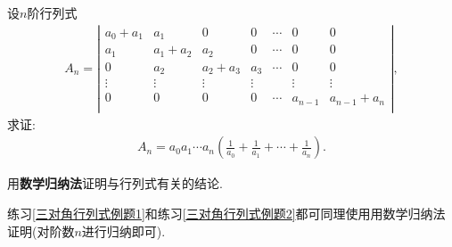 \documentclass[../../main.tex]{subfiles}%
\begin{document}
\begin{example}\label{使用数学归纳法计算行列式例题1}
    设$n$阶行列式
    \begin{align}
    A_n=\left| \begin{matrix}
    a_0+a_1&		a_1&		0&		0&		\cdots&		0&		0\\
    a_1&		a_1+a_2&		a_2&		0&		\cdots&		0&		0\\
    0&		a_2&		a_2+a_3&		a_3&		\cdots&		0&		0\\
    \vdots&		\vdots&		\vdots&		\vdots&		&		\vdots&		\vdots\\
    0&		0&		0&		0&		\cdots&		a_{n-1}&		a_{n-1}+a_n\\
    \end{matrix} \right|,
    \nonumber
    \end{align}
    求证:
    \begin{align}
    A_n=a_0a_1\cdots a_n\left( \frac{1}{a_0}+\frac{1}{a_1}+\cdots +\frac{1}{a_n} \right) .
    \nonumber
    \end{align}
    \end{example}
    \begin{note}
    用\hypertarget{用数学归纳法与行列式有关的结论}{\textbf{数学归纳法}}证明与行列式有关的结论.
    
    练习\ref{三对角行列式例题1}和练习\ref{三对角行列式例题2}都可同理使用用数学归纳法证明(对阶数$n$进行归纳即可).
    \end{note}
\end{document}
